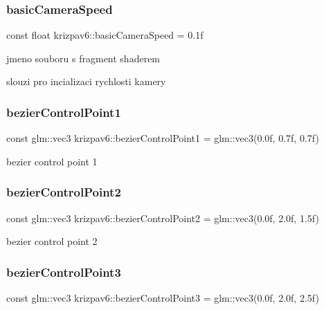 \mbox{\label{namespacekrizpav6_a121fd2aa12343a58b6ef6013ce3e2e13}} 
\subsubsection{\texorpdfstring{basicCameraSpeed}{basicCameraSpeed}}
{\footnotesize\ttfamily const float krizpav6\+::basic\+Camera\+Speed = 0.\+1f}



jmeno souboru s fragment shaderem 

slouzi pro incializaci rychlosti kamery \mbox{\label{namespacekrizpav6_a213943a0ef62f1dd281b843bafcea43e}} 
\subsubsection{\texorpdfstring{bezierControlPoint1}{bezierControlPoint1}}
{\footnotesize\ttfamily const glm\+::vec3 krizpav6\+::bezier\+Control\+Point1 = glm\+::vec3(0.\+0f, 0.\+7f, 0.\+7f)}



bezier control point 1 

\mbox{\label{namespacekrizpav6_a54b795bfc7a32943c80e912cba91c335}} 
\subsubsection{\texorpdfstring{bezierControlPoint2}{bezierControlPoint2}}
{\footnotesize\ttfamily const glm\+::vec3 krizpav6\+::bezier\+Control\+Point2 = glm\+::vec3(0.\+0f, 2.\+0f, 1.\+5f)}



bezier control point 2 

\mbox{\label{namespacekrizpav6_aed8a4be355e210b8bb7b23d0b2ef8355}} 
\subsubsection{\texorpdfstring{bezierControlPoint3}{bezierControlPoint3}}
{\footnotesize\ttfamily const glm\+::vec3 krizpav6\+::bezier\+Control\+Point3 = glm\+::vec3(0.\+0f, 2.\+0f, 2.\+5f)}



